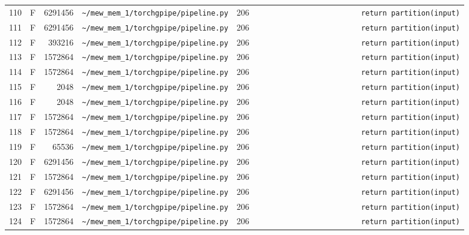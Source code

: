 \documentclass{article}
\begin{document}
\begin{longtable}{r l r p{6.5cm} r p{7.0cm}}
110 & F & 6291456 & \lstinline|~/mew_mem_1/torchgpipe/pipeline.py| & 206 & \lstinline|                        return partition(input)| \\
111 & F & 6291456 & \lstinline|~/mew_mem_1/torchgpipe/pipeline.py| & 206 & \lstinline|                        return partition(input)| \\
112 & F & 393216 & \lstinline|~/mew_mem_1/torchgpipe/pipeline.py| & 206 & \lstinline|                        return partition(input)| \\
113 & F & 1572864 & \lstinline|~/mew_mem_1/torchgpipe/pipeline.py| & 206 & \lstinline|                        return partition(input)| \\
114 & F & 1572864 & \lstinline|~/mew_mem_1/torchgpipe/pipeline.py| & 206 & \lstinline|                        return partition(input)| \\
115 & F & 2048 & \lstinline|~/mew_mem_1/torchgpipe/pipeline.py| & 206 & \lstinline|                        return partition(input)| \\
116 & F & 2048 & \lstinline|~/mew_mem_1/torchgpipe/pipeline.py| & 206 & \lstinline|                        return partition(input)| \\
117 & F & 1572864 & \lstinline|~/mew_mem_1/torchgpipe/pipeline.py| & 206 & \lstinline|                        return partition(input)| \\
118 & F & 1572864 & \lstinline|~/mew_mem_1/torchgpipe/pipeline.py| & 206 & \lstinline|                        return partition(input)| \\
119 & F & 65536 & \lstinline|~/mew_mem_1/torchgpipe/pipeline.py| & 206 & \lstinline|                        return partition(input)| \\
120 & F & 6291456 & \lstinline|~/mew_mem_1/torchgpipe/pipeline.py| & 206 & \lstinline|                        return partition(input)| \\
121 & F & 1572864 & \lstinline|~/mew_mem_1/torchgpipe/pipeline.py| & 206 & \lstinline|                        return partition(input)| \\
122 & F & 6291456 & \lstinline|~/mew_mem_1/torchgpipe/pipeline.py| & 206 & \lstinline|                        return partition(input)| \\
123 & F & 1572864 & \lstinline|~/mew_mem_1/torchgpipe/pipeline.py| & 206 & \lstinline|                        return partition(input)| \\
124 & F & 1572864 & \lstinline|~/mew_mem_1/torchgpipe/pipeline.py| & 206 & \lstinline|                        return partition(input)| \\

\end{longtable}
\end{document}
